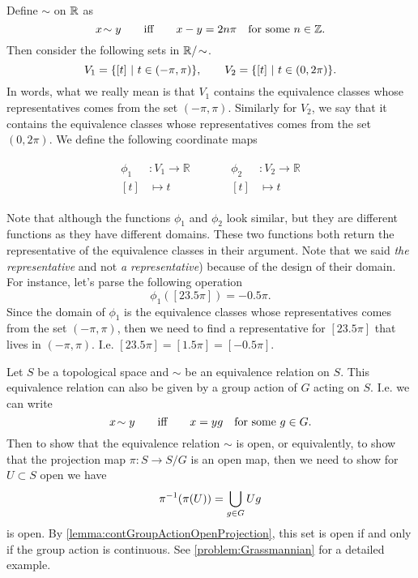 \begin{summary}
	Define $ \sim $ on $ \mathbb{R} $ as
	\[ x\sim y \qquad \text{iff} \qquad x-y = 2n\pi \quad\text{for some $ n \in \Z $}. \]
	Then consider the following sets in $ \R/\sim $.
	\[ V_1 = \{[t]\ |\ t\in (-\pi,\pi) \}, \qquad V_2 = \{[t]\ |\ t\in(0,2\pi)\}. \]
	In words, what we really mean is that $ V_1 $ contains the equivalence classes whose representatives comes from the set $ (-\pi,\pi) $. Similarly for $ V_2 $, we say that it contains the equivalence classes whose representatives comes from the set $ (0,2\pi) $. We define the following coordinate maps
	
	\[
	\begin{array}{cc}
		\begin{aligned}
			\phi_1 &: V_1 \to \mathbb{R} \\
			[t] &\mapsto t 
		\end{aligned}
		&\qquad
		\begin{aligned}
			\phi_2 &: V_2 \to \mathbb{R} \\
			[t] & \mapsto t 
		\end{aligned}
	\end{array}
	\]
	
	Note that although the functions $ \phi_1 $ and $ \phi_2 $ look similar, but they are different functions as they have different domains. These two functions both return the representative of the equivalence classes in their argument. Note that we said \emph{the representative} and not \emph{a representative}) because of the design of their domain. For instance, let's parse the following operation 
	\[ \phi_1 ([23.5\pi]) =  -0.5\pi. \]
	Since the domain of $ \phi_1 $ is the equivalence classes whose representatives comes from the set $ (-\pi,\pi) $, then we need to find a representative for $ [23.5\pi] $ that lives in $ (-\pi,\pi) $. I.e. $ [23.5\pi] = [1.5\pi] = [-0.5\pi] $.
\end{summary}

\begin{summary}
	Let $ S $ be a topological space and $ \sim $ be an equivalence relation on $ S $. This equivalence relation can also be given by a group action of $ G $ acting on $ S $. I.e. we can write
	\[ x\sim y \qquad \text{iff}  \qquad x = yg \quad \text{for some $ g \in G $}. \] 
	Then to show that the equivalence relation $ \sim $ is open, or equivalently, to show that the projection map $ \pi : S \to S/G $ is an open map, then we need to show for $ U \subset S $ open we have
	\[ \pi^{-1}(\pi(U)) = \bigcup_{g\in G} Ug \]
	is open. By \autoref{lemma:contGroupActionOpenProjection}, this set is open if and only if the group action is continuous. See \autoref{problem:Grassmannian} for a detailed example.
\end{summary}

\newpage

